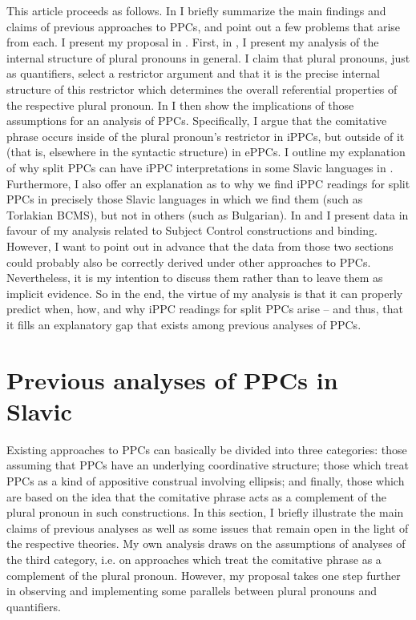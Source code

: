 \documentclass[output=paper,colorlinks,citecolor=brown]{langscibook}
\begin{document}
This article proceeds as follows. In  I briefly summarize the main findings and claims of previous approaches to PPCs, and point out a few problems that arise from each. I present my proposal in . First, in , I present my analysis of the internal structure of plural pronouns in general. I claim that plural pronouns, just as quantifiers, select a restrictor argument and that it is the precise internal structure of this restrictor which determines the overall referential properties of the respective plural pronoun. In  I then show the implications of those assumptions for an analysis of PPCs. Specifically, I argue that the comitative phrase occurs inside of the plural pronoun's restrictor in iPPCs, but outside of it (that is, elsewhere in the syntactic structure) in ePPCs. I outline my explanation of why split PPCs can have iPPC interpretations in some Slavic languages in . Furthermore, I also offer an explanation as to why we find iPPC readings for split PPCs in precisely those Slavic languages in which we find them (such as Torlakian BCMS), but not in others (such as Bulgarian). In  and  I present data in favour of my analysis related to Subject Control constructions and binding. However, I want to point out in advance that the data from those two sections could probably also be correctly derived under other approaches to PPCs. Nevertheless, it is my intention to discuss them rather than to leave them as implicit evidence. So in the end, the virtue of my analysis is that it can properly predict when, how, and why iPPC readings for split PPCs arise -- and thus, that it fills an explanatory gap that exists among previous analyses of PPCs. 




\section{Previous analyses of PPCs in Slavic}\label{sec:prev}
Existing approaches to PPCs can basically be divided into three categories: those assuming that PPCs have an underlying coordinative structure; those which treat PPCs as a kind of appositive construal involving ellipsis; and finally, those which are based on the idea that the comitative phrase acts as a complement of the plural pronoun in such constructions. In this section, I briefly illustrate the main claims of previous analyses as well as some issues that remain open in the light of the respective theories. My own analysis draws on the assumptions of analyses of the third category, i.e. on approaches which treat the comitative phrase as a complement of the plural pronoun. However, my proposal takes one step further in observing and implementing some parallels between plural pronouns and quantifiers. 
\end{document}
